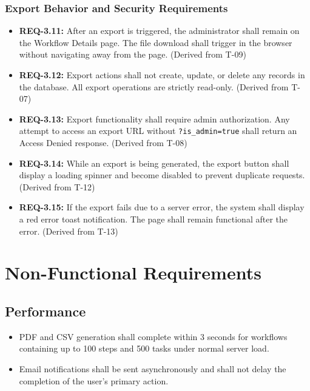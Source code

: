 \documentclass[12pt]{article}
\begin{document}
\subsubsection{Export Behavior and Security Requirements}
\begin{itemize}
    \item \textbf{REQ-3.11:} After an export is triggered, the administrator shall remain
    on the Workflow Details page. The file download shall trigger in the browser without
    navigating away from the page. (Derived from T-09)
    \item \textbf{REQ-3.12:} Export actions shall not create, update, or delete any records
    in the database. All export operations are strictly read-only. (Derived from T-07)
    \item \textbf{REQ-3.13:} Export functionality shall require admin authorization. Any
    attempt to access an export URL without \texttt{?is\_admin=true} shall return an
    Access Denied response. (Derived from T-08)
    \item \textbf{REQ-3.14:} While an export is being generated, the export button shall
    display a loading spinner and become disabled to prevent duplicate requests.
    (Derived from T-12)
    \item \textbf{REQ-3.15:} If the export fails due to a server error, the system shall
    display a red error toast notification. The page shall remain functional after the
    error. (Derived from T-13)
\end{itemize}
 
\section{Non-Functional Requirements}
 
\subsection{Performance}
\begin{itemize}
    \item PDF and CSV generation shall complete within 3 seconds for workflows containing
    up to 100 steps and 500 tasks under normal server load.
    \item Email notifications shall be sent asynchronously and shall not delay the
    completion of the user's primary action.
\end{itemize}
 
\end{document}
